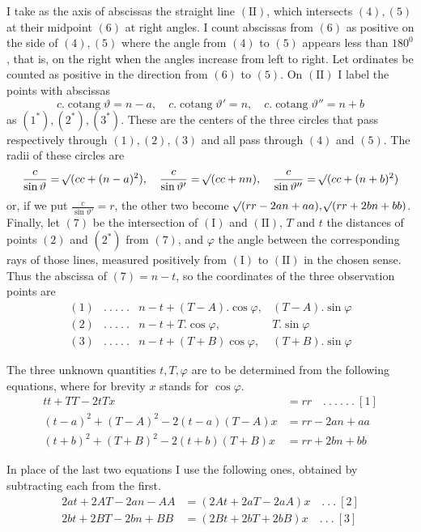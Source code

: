 %
\par
I take as the axis of abscissas the straight line \(\mathrm{(II)}\), which intersects \((4),(5)\) at their midpoint \((6)\) at right angles. I count abscissas from \((6)\) as positive on the side of \((4),(5)\) where the angle from \((4)\) to \((5)\) appears less than \(180^0\), that is, on the right when the angles increase from left to right. Let ordinates be counted as positive in the direction from \((6)\) to \((5)\). On \(\mathrm{(II)}\) I label the points with abscissas
\[c.\operatorname{cotang}\vartheta=n-a,\quad c.\operatorname{cotang}\vartheta'=n,\quad c.\operatorname{cotang}\vartheta''=n+b\]
as \((1^*),(2^*),(3^*)\). These are the centers of the three circles that pass respectively through \((1),(2),(3)\) and all pass through \((4)\) and \((5)\). The radii of these circles are
\[\frac c{\sin\vartheta}=\mathord{{}^{}\!\surd}(cc+(n-a)^2),\quad\frac c{\sin\vartheta'}=\mathord{{}^{}\!\surd}(cc+nn),\quad\frac c{\sin\vartheta''}=\mathord{{}^{}\!\surd}(cc+(n+b)^2)\]
or, if we put \(\frac c{\sin\vartheta'}=r\), the other two become \(\mathord{{}^{}\!\surd}(rr-2an+aa),\mathord{{}^{}\!\surd}(rr+2bn+bb)\). Finally, let \((7)\) be the intersection of \(\mathrm{(I)}\) and \(\mathrm{(II)}\), \(T\) and \(t\) the distances of points \((2)\) and \((2^*)\) from \((7)\), and \(\varphi\) the angle between the corresponding rays of those lines, measured positively from \(\mathrm{(I)}\) to \(\mathrm{(II)}\) in the chosen sense. Thus the abscissa of \((7)=n-t\), so the coordinates of the three observation points are
\[\begin{array}{rcll}(1)&.\ .\ .\ .\ .&n-t+(T-A).\cos\varphi,&(T-A).\sin\varphi\\
(2)&.\ .\ .\ .\ .&n-t+T.\cos\varphi,&T.\sin\varphi\\
(3)&.\ .\ .\ .\ .&n-t+(T+B)\cos\varphi,&(T+B).\sin\varphi\end{array}\]
\par
The three unknown quantities \(t,T,\varphi\) are to be determined from the following equations, where for brevity \(x\) stands for \(\cos\varphi\).
\[\begin{aligned}tt+TT-2tTx&=rr\quad.\ .\ .\ .\ .\ .\ [1]\\
(t-a)^2+(T-A)^2-2(t-a)(T-A)x&=rr-2an+aa\\
(t+b)^2+(T+B)^2-2(t+b)(T+B)x&=rr+2bn+bb\end{aligned}\]
\par
In place of the last two equations I use the following ones, obtained by subtracting each from the first.
\[\begin{aligned}2at+2AT-2an-AA&=(2At+2aT-2aA)x\quad.\ .\ .\ [2]\\
2bt+2BT-2bn+BB&=(2Bt+2bT+2bB)x\quad.\ .\ .\ [3]\end{aligned}\]
